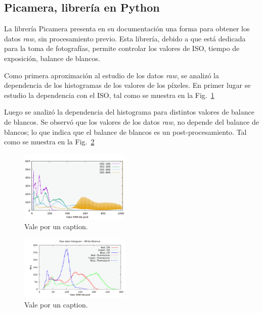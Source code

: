 \documentclass[twoside,twocolumn]{article}
\begin{document}
  \subsection{Picamera, librería en Python} %
    La librería Picamera presenta en su documentación una forma para obtener los datos \emph{raw}, sin procesamiento previo.
    Esta librería, debido a que está dedicada para la toma de fotografías, permite controlar los valores de ISO, tiempo de exposición,
    balance de blancos.

    Como primera aproximación al estudio de los datos \emph{raw}, se analizó la dependencia de los histogramas de los valores de los píxeles.
    En primer lugar se estudio la dependencia con el ISO, tal como se muestra en la Fig.~\ref{fig:ISO}

    Luego se analizó la dependencia del histograma para distintos valores de balance de blancos.
    Se observó que los valores de los datos \emph{raw}, no depende del balance de blancos;
    lo que indica que el balance de blancos es un post-procesamiento.
    Tal como se muestra en la Fig.~\ref{fig:WB}

    \begin{figure}[h]
      \includegraphics[width=0.47\textwidth]{figures/ISO.png}
      \caption{Vale por un caption.
      }
      \label{fig:ISO}
    \end{figure}

    \begin{figure}[h]
      \includegraphics[width=0.47\textwidth]{figures/WB_component_transparent.png}
      \caption{Vale por un caption.
      }
      \label{fig:WB}
    \end{figure}

\end{document}

